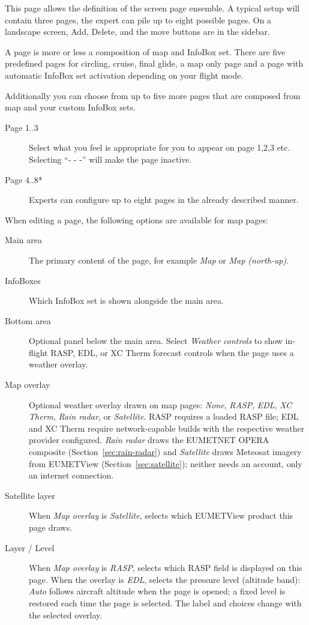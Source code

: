 This page allows the definition of the screen page ensemble. A typical setup 
will contain three pages, the expert can pile up to eight possible pages.
On a landscape screen, Add, Delete, and the move buttons are in the
sidebar.

A page is more or less a composition of map and InfoBox set. There are five 
predefined pages for circling, cruise, final glide, a map only page and a 
page with automatic InfoBox set activation depending on your flight mode.

Additionally you can choose from up to five more pages that are composed from map 
and your custom InfoBox sets.  

\begin{description}
\item[Page 1..3]  Select what you feel is appropriate for you to appear on page 1,2,3 etc. 
  Selecting ``- - -'' will make the page inactive.
\item[Page 4..8*]  Experts can configure up to eight pages in the already 
  described manner.
\end{description}

When editing a page, the following options are available for map pages:
\begin{description}
\item[Main area]  The primary content of the page, for example \emph{Map}
  or \emph{Map (north-up)}.
\item[InfoBoxes]  Which InfoBox set is shown alongside the main area.
\item[Bottom area]  Optional panel below the main area.  Select
  \emph{Weather controls} to show in-flight RASP, EDL, or XC Therm forecast
  controls when the page uses a weather overlay.
\item[Map overlay]  Optional weather overlay drawn on map pages: \emph{None},
  \emph{RASP}, \emph{EDL}, \emph{XC Therm}, \emph{Rain radar}, or
  \emph{Satellite}.  RASP requires a loaded RASP file; EDL and XC Therm
  require network-capable builds with the respective weather provider
  configured.  \emph{Rain radar} draws the EUMETNET OPERA composite
  (Section~\ref{sec:rain-radar}) and \emph{Satellite} draws Meteosat
  imagery from EUMETView (Section~\ref{sec:satellite}); neither needs an
  account, only an internet connection.
\item[Satellite layer]  When \emph{Map overlay} is \emph{Satellite},
  selects which EUMETView product this page draws.
\item[Layer / Level]  When \emph{Map overlay} is \emph{RASP}, selects
  which RASP field is displayed on this page.  When the overlay is
  \emph{EDL}, selects the pressure level (altitude band): \emph{Auto}
  follows aircraft altitude when the page is opened; a fixed level is
  restored each time the page is selected.  The label and choices
  change with the selected overlay.
\end{description}


